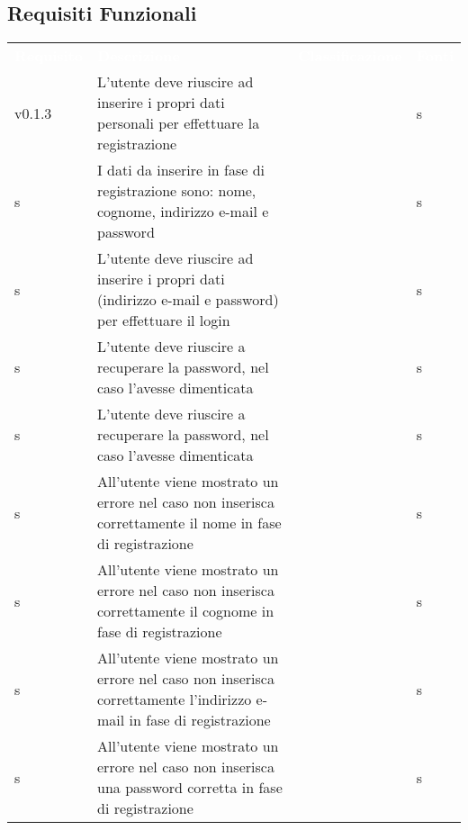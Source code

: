 \subsection{Requisiti Funzionali}


\renewcommand{\arraystretch}{1.5}
\begin{longtable}{ m{}<{\centering}  m{}<{\centering}  m{}<{\centering}  m{}<{\centering}}
	\rowcolor{darkblue}
	\textcolor{white}{\textbf{Requisito}} &\textcolor{white}{\textbf{Descrizione}}& \textcolor{white}{\textbf{Classificazione}} & \textcolor{white}{\textbf{Fonti}}\\ 

	v0.1.3 & L’utente deve riuscire ad inserire i propri dati personali per effettuare la registrazione & \Ob & s\\	

	 \rowcolor{gray!25} s & I dati da inserire in fase di registrazione sono: nome, cognome, indirizzo e-mail e password & \Ob & s\\	
	 
	 s & L’utente deve riuscire ad inserire i propri dati (indirizzo e-mail e password) per effettuare il login & \Ob & s\\	

	 \rowcolor{gray!25} s & L’utente deve riuscire a recuperare la password, nel caso l’avesse dimenticata & \Ob & s\\	
	 
	 \rowcolor{gray!25} s & L’utente deve riuscire a recuperare la password, nel caso l’avesse dimenticata & \Ob & s\\	
	 
	 s & All’utente viene mostrato un errore nel caso non inserisca correttamente il nome in fase di registrazione & \Ob & s\\	
	 
	 \rowcolor{gray!25} s & All’utente viene mostrato un errore nel caso non inserisca correttamente il cognome in fase di registrazione & \Ob & s\\	
	 
	 \rowcolor{gray!25} s & All’utente viene mostrato un errore nel caso non inserisca correttamente l’indirizzo e-mail in fase di registrazione & \Ob & s\\	

	 s & All’utente viene mostrato un errore nel caso non inserisca una password corretta in fase di registrazione & \Ob & s\\	
	 

\end{longtable}
